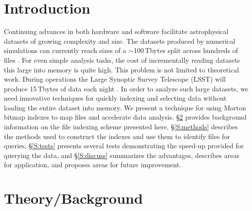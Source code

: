 \documentclass[apjl]{emulateapj}
\newcommand{\TB}{\,Tbytes}
\begin{document}
\section{Introduction}\label{S:intro}
Continuing advances in both hardware and software facilitate astrophysical datasets of growing complexity and size. The datasets produced by numerical simulations can currently reach sizes of a $\sim$100\TB{ }split across hundreds of files \citep[e.g.][]{Croft2015}. For even simple analysis tasks, the cost of incrementally reading datasets this large into memory is quite high. This problem is not limited to theoretical work. During operations the Large Synoptic Survey Telescope (LSST) will produce 15\TB{ }of data each night \citep{Juric2015a}. In order to analyze such large datasets, we need innovative techniques for quickly indexing and selecting data without loading the entire dataset into memory. We present a technique for using Morton bitmap indexes to map files and accelerate data analysis. \S\ref{S:theory} provides background information on the file indexing scheme presented here, \S\ref{S:methods} describes the methods used to construct the indexes and use them to identify files for queries, \S\ref{S:tests} presents several tests demonstrating the speed-up provided for querying the data, and \S\ref{S:discuss} summarizes the advantages, describes areas for application, and proposes areas for future improvement.

\section{Theory/Background}\label{S:theory}

\end{document}
